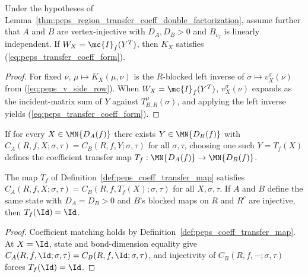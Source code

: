 \begin{lemma}
    \label{thm:peps_region_transfer_coeff_incident_form}
    \leanok
    Under the hypotheses of Lemma~\ref{thm:peps_region_transfer_coeff_double_factorization}, assume further that $A$ and $B$ are vertex-injective with $D_A,D_B>0$ and $B_{v_f}$ is linearly independent. If $W_X=\mc{I}_f(Y^T)$, then $K_X$ satisfies (\ref{eq:peps_transfer_coeff_form}).
\end{lemma}
\begin{proof}\leanok
    For fixed $\nu$, $\mu\mapsto K_X(\mu,\nu)$ is the $R$-blocked left inverse of $\sigma\mapsto v_X^\sigma(\nu)$ from (\ref{eq:peps_v_side_row}). When $W_X=\mc{I}_f(Y^T)$, $v_X^\sigma(\nu)$ expands as the incident-matrix sum of $Y$ against $T_{B,R}^\mu(\sigma)$, and applying the left inverse yields (\ref{eq:peps_transfer_coeff_form}).
\end{proof}

\begin{definition}
    \label{def:peps_coeff_transfer_map}
    \leanok
    If for every $X\in\MN{D_A(f)}$ there exists $Y\in\MN{D_B(f)}$ with $C_A(R,f,X;\sigma,\tau)=C_B(R,f,Y;\sigma,\tau)$ for all $\sigma,\tau$, choosing one such $Y=T_f(X)$ defines the coefficient transfer map $T_f:\MN{D_A(f)}\to\MN{D_B(f)}$.
\end{definition}

\begin{lemma}
    \label{thm:peps_coeff_transfer_map_properties}
    \leanok
    The map $T_f$ of Definition~\ref{def:peps_coeff_transfer_map} satisfies $C_A(R,f,X;\sigma,\tau)=C_B(R,f,T_f(X);\sigma,\tau)$ for all $X,\sigma,\tau$. If $A$ and $B$ define the same state with $D_A=D_B>0$ and $B$'s blocked maps on $R$ and $R^c$ are injective, then $T_f(\Id)=\Id$.
\end{lemma}
\begin{proof}\leanok
    Coefficient matching holds by Definition~\ref{def:peps_coeff_transfer_map}. At $X=\Id$, state and bond-dimension equality give $C_A(R,f,\Id;\sigma,\tau)=C_B(R,f,\Id;\sigma,\tau)$, and injectivity of $C_B(R,f,-;\sigma,\tau)$ forces $T_f(\Id)=\Id$.
\end{proof}

